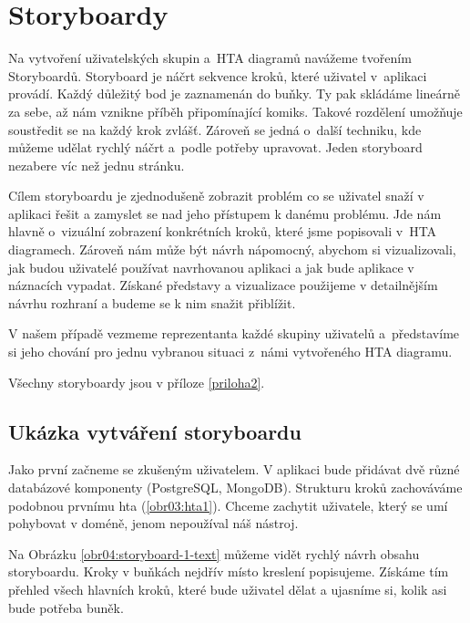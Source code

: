 \chapter{Storyboardy}

Na vytvoření uživatelských skupin a~HTA diagramů navážeme tvořením Storyboardů. Storyboard je náčrt sekvence kroků, které uživatel v~aplikaci provádí. Každý důležitý bod je zaznamenán do buňky. Ty pak skládáme lineárně za sebe, až nám vznikne příběh připomínající komiks. Takové rozdělení umožňuje soustředit se na každý krok zvlášť. Zároveň se jedná o~další techniku, kde můžeme udělat rychlý náčrt a~podle potřeby upravovat. Jeden storyboard nezabere víc než jednu stránku.

Cílem storyboardu je zjednodušeně zobrazit problém co se uživatel snaží v aplikaci řešit a zamyslet se nad jeho přístupem k danému problému. Jde nám hlavně o~vizuální zobrazení konkrétních kroků, které jsme popisovali v~HTA diagramech. Zároveň nám může být návrh nápomocný, abychom si vizualizovali, jak budou uživatelé používat navrhovanou aplikaci a jak bude aplikace v náznacích vypadat. Získané představy a vizualizace použijeme v detailnějším návrhu rozhraní a budeme se k nim snažit přiblížit.

V našem případě vezmeme reprezentanta každé skupiny uživatelů a~představíme si jeho chování pro jednu vybranou situaci z~námi vytvořeného HTA diagramu.

Všechny storyboardy jsou v příloze \ref{priloha2}.

\section{Ukázka vytváření storyboardu}

Jako první začneme se zkušeným uživatelem. V aplikaci bude přidávat dvě různé databázové komponenty (PostgreSQL, MongoDB). Strukturu kroků zachováváme podobnou prvnímu hta (\ref{obr03:hta1}). Chceme zachytit uživatele, který se umí pohybovat v doméně, jenom nepoužíval náš nástroj.

Na Obrázku \ref{obr04:storyboard-1-text} můžeme vidět rychlý návrh obsahu storyboardu. Kroky v buňkách nejdřív místo kreslení popisujeme. Získáme tím přehled všech hlavních kroků, které bude uživatel dělat a ujasníme si, kolik asi bude potřeba buněk.

